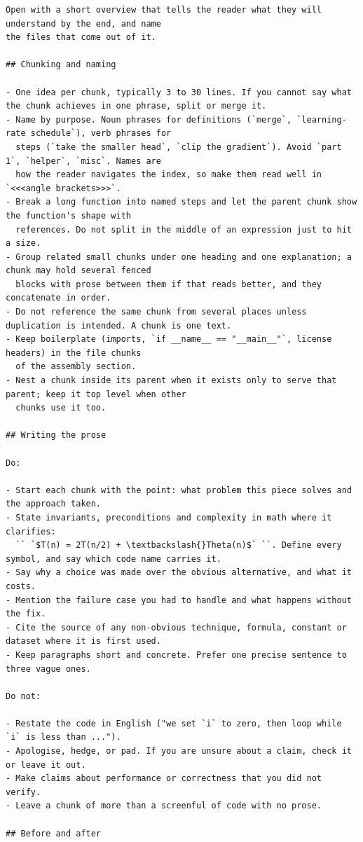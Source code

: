 \documentclass[10pt,a4paper]{article}
\newcounter{chunk}
\begin{document}
\begin{Verbatim}
Open with a short overview that tells the reader what they will understand by the end, and name
the files that come out of it.

## Chunking and naming

- One idea per chunk, typically 3 to 30 lines. If you cannot say what the chunk achieves in one phrase, split or merge it.
- Name by purpose. Noun phrases for definitions (`merge`, `learning-rate schedule`), verb phrases for
  steps (`take the smaller head`, `clip the gradient`). Avoid `part 1`, `helper`, `misc`. Names are
  how the reader navigates the index, so make them read well in `<<<angle brackets>>>`.
- Break a long function into named steps and let the parent chunk show the function's shape with
  references. Do not split in the middle of an expression just to hit a size.
- Group related small chunks under one heading and one explanation; a chunk may hold several fenced
  blocks with prose between them if that reads better, and they concatenate in order.
- Do not reference the same chunk from several places unless duplication is intended. A chunk is one text.
- Keep boilerplate (imports, `if __name__ == "__main__"`, license headers) in the file chunks
  of the assembly section.
- Nest a chunk inside its parent when it exists only to serve that parent; keep it top level when other
  chunks use it too.

## Writing the prose

Do:

- Start each chunk with the point: what problem this piece solves and the approach taken.
- State invariants, preconditions and complexity in math where it clarifies:
  `` `$T(n) = 2T(n/2) + \textbackslash{}Theta(n)$` ``. Define every symbol, and say which code name carries it.
- Say why a choice was made over the obvious alternative, and what it costs.
- Mention the failure case you had to handle and what happens without the fix.
- Cite the source of any non-obvious technique, formula, constant or dataset where it is first used.
- Keep paragraphs short and concrete. Prefer one precise sentence to three vague ones.

Do not:

- Restate the code in English ("we set `i` to zero, then loop while `i` is less than ...").
- Apologise, hedge, or pad. If you are unsure about a claim, check it or leave it out.
- Make claims about performance or correctness that you did not verify.
- Leave a chunk of more than a screenful of code with no prose.

## Before and after


\end{Verbatim}
\end{document}

